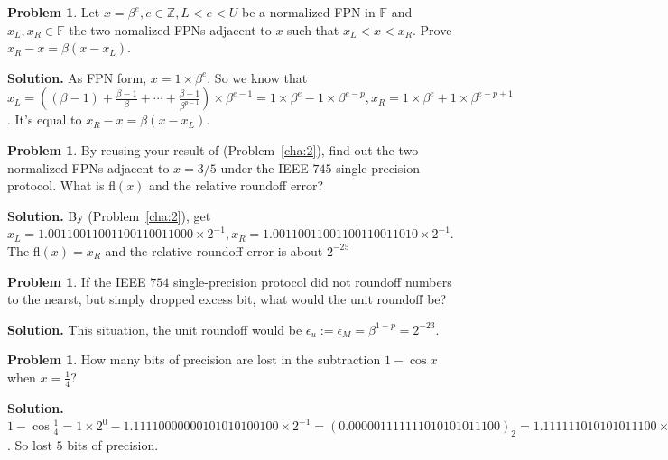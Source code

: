\documentclass[a4paper]{book}
\newenvironment{solution}%
{\noindent\textbf{Solution.}}%
{\qedhere}
\numberwithin{equation}{chapter}
\theoremstyle{definition}
\newtheorem{pro}[exm]{Problem}
\begin{document}
\begin{pro}\label{cha:3}
  Let $x = \beta^e, e \in \mathbb{Z}, L < e < U$ be a normalized FPN in $\mathbb{F}$ and $x_L ,x_R \in \mathbb{F}$ the two nomalized FPNs adjacent to $x$ such that $x_L < x < x_R$. Prove $x_R - x = \beta(x - x_L)$.
\end{pro}

\begin{solution}
  As FPN form, $x = 1 \times \beta^e$. So we know that $x_L = ((\beta - 1) + \frac{\beta -1}{\beta} + \cdots + \frac{\beta -1}{\beta^{p-1}} ) \times \beta^{e - 1} = 1 \times \beta^e - 1 \times \beta^{e-p}, x_R = 1 \times \beta^e + 1 \times \beta^{e-p+1}$. It's equal to $x_R - x = \beta(x - x_L)$.
\end{solution}

\begin{pro}
  By reusing your result of (Problem~\ref{cha:2}), find out the two normalized FPNs adjacent to $x = 3/5$ under the IEEE $745$ single-precision protocol. What is fl$(x)$ and the relative roundoff error?
\end{pro}

\begin{solution}
  By (Problem~\ref{cha:2}), get $x_L =  1.00110011001100110011000 \times 2^{-1}, x_R =  1.00110011001100110011010 \times 2^{-1}$. The fl$(x) = x_R$ and the relative roundoff error is about $2^{-25}$
\end{solution}

\begin{pro}
  If the IEEE $754$ single-precision protocol did not roundoff numbers to the nearst, but simply dropped excess bit, what would the unit roundoff be?
\end{pro}

\begin{solution}
  This situation, the unit roundoff would be $\epsilon_u := \epsilon_M = \beta^{1 - p} = 2^{-23}$.
\end{solution}

\begin{pro}
  How many bits of precision are lost in the subtraction $1 - \cos x$ when $x = \frac{1}{4}$?
\end{pro}

\begin{solution}
  $1 - \cos \frac{1}{4} = 1 \times 2^0 - 1.11110000000101010100100 \times 2^{-1} = (0.000001111111010101011100)_2 = 1.111111010101011100 \times 2^{-6}$. So lost $5$ bits of precision.
\end{solution}
\end{document}
